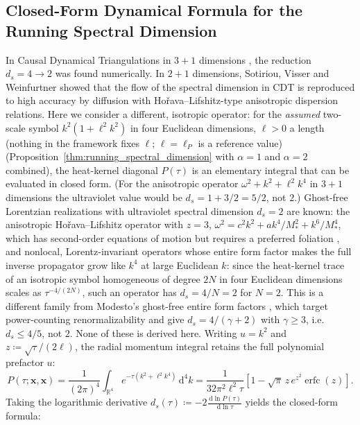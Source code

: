 \documentclass[11pt,a4paper,reqno]{amsart}
\theoremstyle{definition}
\numberwithin{equation}{section}
\providecommand{\R}{\mathbb{R}}
\newcommand{\dif}{\,\mathrm{d}}
\providecommand{\R}{\mathbb{R}}
\begin{document}
\subsection{Closed-Form Dynamical Formula for the Running Spectral Dimension}
In Causal Dynamical Triangulations in $3+1$ dimensions \cite{ambjorn2005spectral}, the reduction $d_s = 4 \to 2$ was found numerically. In $2+1$ dimensions, Sotiriou, Visser and Weinfurtner \cite{sotiriou2011spectral} showed that the flow of the spectral dimension in CDT is reproduced to high accuracy by diffusion with Ho\v{r}ava--Lifshitz-type anisotropic dispersion relations. Here we consider a different, isotropic operator: for the \emph{assumed} two-scale symbol $k^2(1 + \ell^2 k^2)$ in four Euclidean dimensions, $\ell > 0$ a length (nothing in the framework fixes $\ell$; $\ell = \ell_P$ is a reference value) (Proposition~\ref{thm:running_spectral_dimension} with $\alpha = 1$ and $\alpha = 2$ combined), the heat-kernel diagonal $P(\tau)$ is an elementary integral that can be evaluated in closed form. (For the anisotropic operator $\omega^2 + k^2 + \ell^2 k^4$ in $3+1$ dimensions the ultraviolet value would be $d_s = 1 + 3/2 = 5/2$, not $2$.) Ghost-free Lorentzian realizations with ultraviolet spectral dimension $d_s = 2$ are known: the anisotropic Ho\v{r}ava--Lifshitz operator with $z = 3$, $\omega^2 = c^2k^2 + ak^4/M_\ast^2 + k^6/M_\ast^4$, which has second-order equations of motion but requires a preferred foliation \cite{horava2009spectral}, and nonlocal, Lorentz-invariant operators whose entire form factor makes the full inverse propagator grow like $k^4$ at large Euclidean $k$: since the heat-kernel trace of an isotropic symbol homogeneous of degree $2N$ in four Euclidean dimensions scales as $\tau^{-4/(2N)}$, such an operator has $d_s = 4/N = 2$ for $N = 2$. This is a different family from Modesto's ghost-free entire form factors \cite{modesto2012}, which target power-counting renormalizability and give $d_s = 4/(\gamma+2)$ with $\gamma \ge 3$, i.e.\ $d_s \le 4/5$, not $2$. None of these is derived here. Writing $u = k^2$ and $z \coloneqq \sqrt{\tau}/(2\ell)$, the radial momentum integral retains the full polynomial prefactor $u$:
\begin{equation}
    P(\tau; \mathbf{x}, \mathbf{x}) = \frac{1}{(2\pi)^4} \int_{\R^4} e^{-\tau (k^2 + \ell^2 k^4)} \dif^4 k = \frac{1}{32 \pi^2 \ell^2 \tau} \left[ 1 - \sqrt{\pi}\, z\, e^{z^2} \operatorname{erfc}(z) \right].
\end{equation}
Taking the logarithmic derivative $d_s(\tau) \coloneqq -2 \frac{\dif \ln P(\tau)}{\dif \ln \tau}$ yields the closed-form formula:
\end{document}

